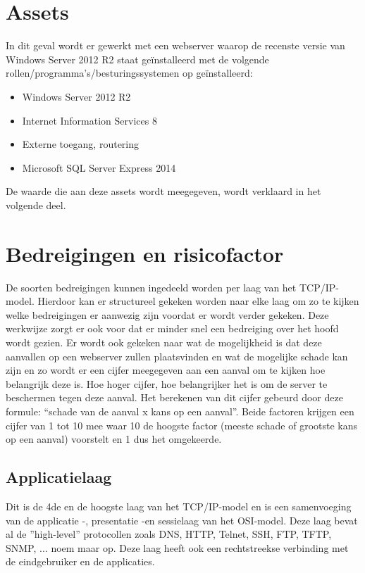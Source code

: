 \documentclass[pdftex,a4paper,12pt]{report}
\begin{document}
\section{Assets}
In dit geval wordt er gewerkt met een webserver waarop de recenste versie van Windows Server 2012 R2 staat geïnstalleerd met de volgende rollen/programma's/besturingssystemen op geïnstalleerd:
\begin{itemize}
	\item Windows Server 2012 R2 
	\item Internet Information Services 8 
	\item Externe toegang, routering 
	\item Microsoft SQL Server Express 2014 
\end{itemize}
De waarde die aan deze assets wordt meegegeven, wordt verklaard in het volgende deel.

\section{Bedreigingen en risicofactor}
De soorten bedreigingen kunnen ingedeeld worden per laag van het TCP/IP-model. Hierdoor kan er structureel gekeken worden naar elke laag om zo te kijken welke bedreigingen er aanwezig zijn voordat er wordt verder gekeken. Deze werkwijze zorgt er ook voor dat er minder snel een bedreiging over het hoofd wordt gezien. Er wordt ook gekeken naar wat de mogelijkheid is dat deze aanvallen op een webserver zullen plaatsvinden en wat de mogelijke schade kan zijn en zo wordt er een cijfer meegegeven aan een aanval om te kijken hoe belangrijk deze is. Hoe hoger cijfer, hoe belangrijker het is om de server te beschermen tegen deze aanval. Het berekenen van dit cijfer gebeurd door deze formule: "`schade van de aanval x kans op een aanval"'. Beide factoren krijgen een cijfer van 1 tot 10 mee waar 10 de hoogste factor (meeste schade of grootste kans op een aanval) voorstelt en 1 dus het omgekeerde. \citep{Sim2005}

\subsection{Applicatielaag}
Dit is de 4de en de hoogste laag van het TCP/IP-model en is een samenvoeging van de applicatie -, presentatie -en sessielaag van het OSI-model. Deze laag bevat al de ''high-level'' protocollen zoals DNS, HTTP, Telnet, SSH, FTP, TFTP, SNMP, ... noem maar op. Deze laag heeft ook een rechtstreekse verbinding met de eindgebruiker en de applicaties. \citep{Thomas2013}
\end{document}
